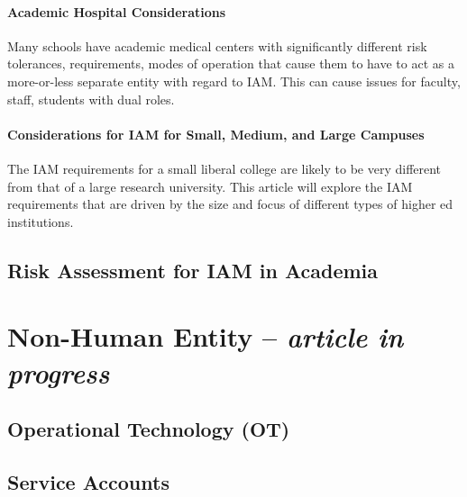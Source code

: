 \hypertarget{academic-hospital-considerations}{%
\subsubsection{Academic Hospital
Considerations}\label{academic-hospital-considerations}}

Many schools have academic medical centers with significantly different
risk tolerances, requirements, modes of operation that cause them to
have to act as a more-or-less separate entity with regard to IAM. This
can cause issues for faculty, staff, students with dual roles.

\hypertarget{considerations-for-iam-for-small-medium-and-large-campuses}{%
\subsubsection{Considerations for IAM for Small, Medium, and Large
Campuses}\label{considerations-for-iam-for-small-medium-and-large-campuses}}

The IAM requirements for a small liberal college are likely to be very
different from that of a large research university. This article will
explore the IAM requirements that are driven by the size and focus of
different types of higher ed institutions.

\hypertarget{risk-assessment-for-iam-in-academia}{%
\section{Risk Assessment for IAM in
Academia}\label{risk-assessment-for-iam-in-academia}}

\hypertarget{non-human-entity-article-in-progress}{%
\chapter{\texorpdfstring{Non-Human Entity -- \emph{article in
progress}}{Non-Human Entity -- article in progress}}\label{non-human-entity-article-in-progress}}

\hypertarget{operational-technology-ot}{%
\section{Operational Technology
(OT)}\label{operational-technology-ot}}

\hypertarget{service-accounts}{%
\section{Service Accounts}\label{service-accounts}}


